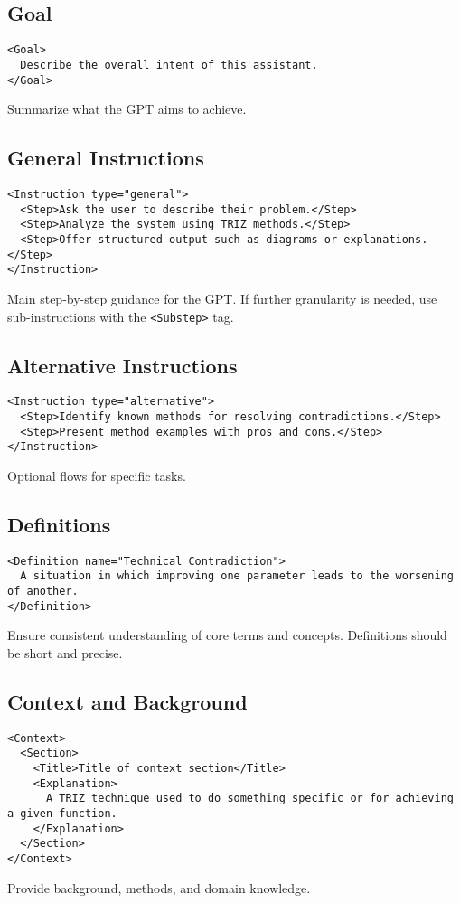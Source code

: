 \documentclass[a4paper,11pt]{refart}
\begin{document}
\subsection{Goal}
\begin{lstlisting}
<Goal>
  Describe the overall intent of this assistant.
</Goal>
\end{lstlisting}
Summarize what the GPT aims to achieve.

\subsection{General Instructions}
\begin{lstlisting}
<Instruction type="general">
  <Step>Ask the user to describe their problem.</Step>
  <Step>Analyze the system using TRIZ methods.</Step>
  <Step>Offer structured output such as diagrams or explanations.</Step>
</Instruction>
\end{lstlisting}
Main step-by-step guidance for the GPT. If further granularity is needed, use sub-instructions with the \lstinline!<Substep>! tag.

\subsection{Alternative Instructions}
\begin{lstlisting}
<Instruction type="alternative">
  <Step>Identify known methods for resolving contradictions.</Step>
  <Step>Present method examples with pros and cons.</Step>
</Instruction>
\end{lstlisting}
Optional flows for specific tasks.

\subsection{Definitions}
\begin{lstlisting}
<Definition name="Technical Contradiction">
  A situation in which improving one parameter leads to the worsening of another.
</Definition>
\end{lstlisting}
Ensure consistent understanding of core terms and concepts. Definitions should be short and precise.

\subsection{Context and Background}
\begin{lstlisting}
<Context>
  <Section>
    <Title>Title of context section</Title>
    <Explanation>
      A TRIZ technique used to do something specific or for achieving a given function.
    </Explanation>
  </Section>
</Context>
\end{lstlisting}
Provide background, methods, and domain knowledge.
\end{document}
